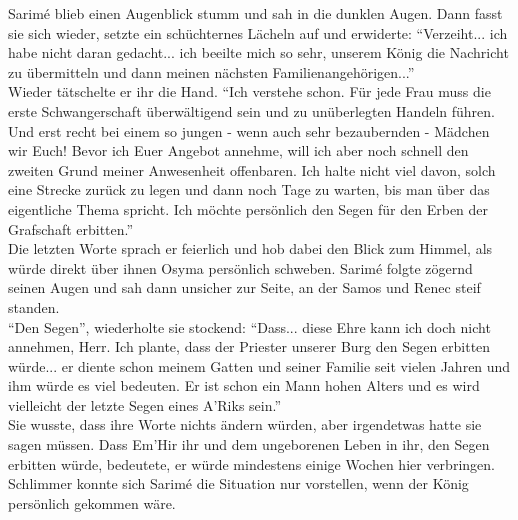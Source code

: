 Sarimé blieb einen Augenblick stumm und sah in die dunklen Augen. Dann fasst sie sich wieder, 
setzte ein schüchternes Lächeln auf und erwiderte: ``Verzeiht... ich habe nicht daran gedacht... 
ich beeilte mich so sehr, unserem König die Nachricht zu übermitteln und dann meinen nächsten 
Familienangehörigen...''\\
Wieder tätschelte er ihr die Hand. ``Ich verstehe schon. Für jede Frau muss die erste 
Schwangerschaft überwältigend sein und zu unüberlegten Handeln führen. Und erst recht bei einem so 
jungen - wenn auch sehr bezaubernden - Mädchen wir Euch! Bevor ich Euer Angebot annehme, will ich 
aber noch schnell den zweiten Grund meiner Anwesenheit offenbaren. Ich halte nicht viel davon, 
solch eine Strecke zurück zu legen und dann noch Tage zu warten, bis man über das eigentliche Thema 
spricht. Ich möchte persönlich den Segen für den Erben der Grafschaft erbitten.''\\
Die letzten Worte sprach er feierlich und hob dabei den Blick zum Himmel, als würde direkt über 
ihnen Osyma persönlich schweben. Sarimé folgte zögernd seinen Augen und sah dann unsicher zur 
Seite, an der Samos und Renec steif standen.\\
``Den Segen'', wiederholte sie stockend: ``Dass... diese Ehre kann ich doch nicht annehmen, Herr. 
Ich plante, dass der Priester unserer Burg den Segen erbitten würde... er diente schon meinem 
Gatten und seiner Familie seit vielen Jahren und ihm würde es viel bedeuten. Er ist schon ein Mann 
hohen Alters und es wird vielleicht der letzte Segen eines A'Riks sein.''\\
Sie wusste, dass ihre Worte nichts ändern würden, aber irgendetwas hatte sie sagen müssen. Dass 
Em'Hir ihr und dem ungeborenen Leben in ihr, den Segen erbitten würde, bedeutete, er würde 
mindestens einige Wochen hier verbringen. Schlimmer konnte sich Sarimé die Situation nur 
vorstellen, wenn der König persönlich gekommen wäre.


